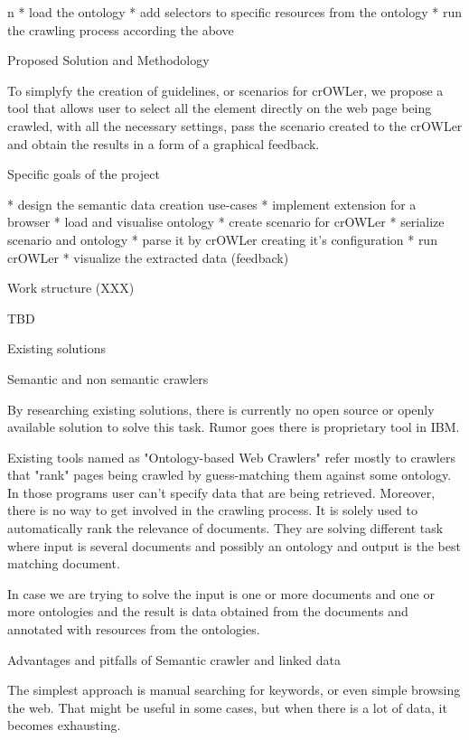 \begitems \style n
  * load the ontology
  * add selectors to specific resources from the ontology
  * run the crawling process according the above
\enditems


\sec Proposed Solution and Methodology

To simplyfy the creation of guidelines, or scenarios for crOWLer, we propose a
tool that allows user to select all the element directly on the web page being
crawled, with all the necessary settings, pass the scenario created to the
crOWLer and obtain the results in a form of a graphical feedback. 

\sec Specific goals of the project

\begitems
  * design the semantic data creation use-cases
  * implement extension for a browser
  * load and visualise ontology
  * create scenario for crOWLer 
  * serialize scenario and ontology
  * parse it by crOWLer creating it's configuration
  * run crOWLer
  * visualize the extracted data (feedback)
\enditems


\sec Work structure (XXX)

TBD

\chap Existing solutions


\sec Semantic and non semantic crawlers

By researching existing solutions, there is currently no open source or openly
available solution to solve this task. Rumor goes there is proprietary tool in IBM.

Existing tools named as "Ontology-based Web Crawlers" refer mostly to crawlers
that "rank" pages being crawled by guess-matching them against some ontology.
In those programs user can't specify data that are being retrieved. Moreover,
there is no way to get involved in the crawling process. It is solely used to
automatically rank the relevance of documents. They are solving different task
where input is several documents and possibly an ontology and output is the
best matching document. 

In case we are trying to solve the input is one or more documents and one or
more ontologies and the result is data obtained from the documents and
annotated with resources from the ontologies. 

\sec Advantages and pitfalls of Semantic crawler and linked data

The simplest approach is manual searching for keywords, or even simple browsing
the web. That might be useful in some cases, but when there is a lot of data,
it becomes exhausting. 

